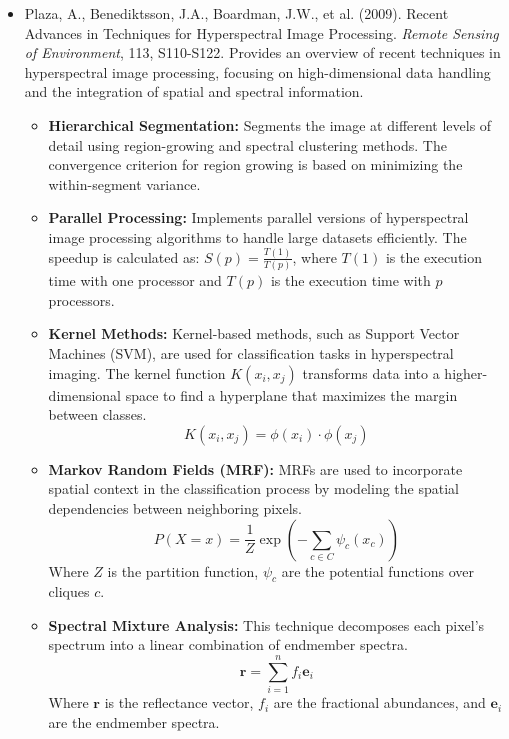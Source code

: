 \documentclass[10pt,svgnames,fragile]{beamer}
\begin{document}
\begin{frame}{}
\tiny
\begin{itemize}

    \item Plaza, A., Benediktsson, J.A., Boardman, J.W., et al. (2009). Recent Advances in Techniques for Hyperspectral Image Processing. \textit{Remote Sensing of Environment}, 113, S110-S122. \href{https://www.sciencedirect.com/science/article/pii/S0034425709000807}{\color{blue}{DOI: 10.1016/j.rse.2009.01.007}}
    {\color{gray}Provides an overview of recent techniques in hyperspectral image processing, focusing on high-dimensional data handling and the integration of spatial and spectral information.}
    \begin{itemize} \tiny
    \item \textbf{Hierarchical Segmentation:} Segments the image at different levels of detail using region-growing and spectral clustering methods. The convergence criterion for region growing is based on minimizing the within-segment variance.
    \item \textbf{Parallel Processing:} Implements parallel versions of hyperspectral image processing algorithms to handle large datasets efficiently. The speedup is calculated as: \( S(p) = \frac{T(1)}{T(p)} \), where \( T(1) \) is the execution time with one processor and \( T(p) \) is the execution time with \( p \) processors.
    \item \textbf{Kernel Methods:} Kernel-based methods, such as Support Vector Machines (SVM), are used for classification tasks in hyperspectral imaging. The kernel function \( K(x_i, x_j) \) transforms data into a higher-dimensional space to find a hyperplane that maximizes the margin between classes.
    \[
    K(x_i, x_j) = \phi(x_i) \cdot \phi(x_j)
    \]
    \item \textbf{Markov Random Fields (MRF):} MRFs are used to incorporate spatial context in the classification process by modeling the spatial dependencies between neighboring pixels.
    \[
    P(X = x) = \frac{1}{Z} \exp\left( - \sum_{c \in C} \psi_c(x_c) \right)
    \]
    Where \( Z \) is the partition function, \( \psi_c \) are the potential functions over cliques \( c \).
    \item \textbf{Spectral Mixture Analysis:} This technique decomposes each pixel's spectrum into a linear combination of endmember spectra.
    \[
    \mathbf{r} = \sum_{i=1}^{n} f_i \mathbf{e}_i
    \]
    Where \( \mathbf{r} \) is the reflectance vector, \( f_i \) are the fractional abundances, and \( \mathbf{e}_i \) are the endmember spectra.
\end{itemize}

\end{itemize}
\end{frame}
\end{document}
